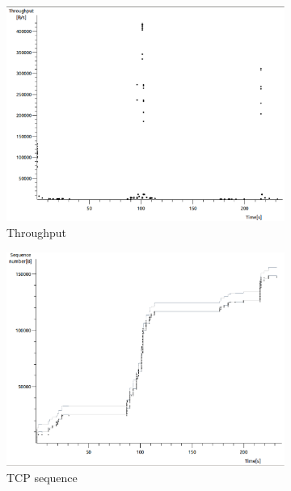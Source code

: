 \documentclass[conference,a4paper]{IEEEtran}
\begin{document}
\begin{figure}
 \centering
 \begin{subfigure}[b]{0.2\textwidth}
  \includegraphics[width=\textwidth]{s8-2_th}
  \caption{Throughput}
 \end{subfigure}
 \begin{subfigure}[b]{0.2\textwidth}
  \includegraphics[width=\textwidth]{s8-2_seq}
  \caption{TCP sequence}
 \end{subfigure}
 \begin{subfigure}[b]{0.2\textwidth}

\end{subfigure}
\end{figure}
\end{document}
